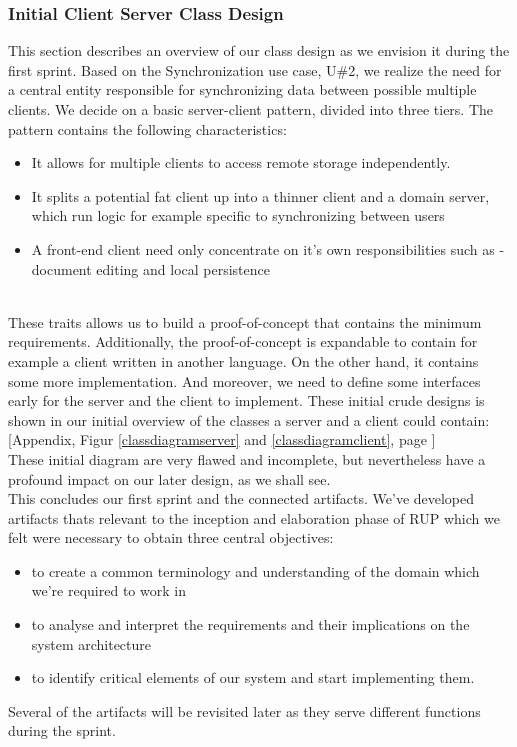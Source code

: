 \subsubsection{Initial Client Server Class Design}
This section describes an overview of our class design as we envision it during the first sprint. Based on the Synchronization use case, U\#2, we realize the need for a central entity responsible for synchronizing data between possible multiple clients. We decide on a basic server-client pattern, divided into three tiers. The pattern contains the following characteristics:\\
\begin{itemize}
\item It allows for multiple clients to access remote storage independently.
\item It splits a potential fat client up into a thinner client and a domain server, which run logic for example specific to synchronizing between users
\item A front-end client need only concentrate on it's own responsibilities such as - document editing and local persistence
\end{itemize}
\cite{ttda}\\
These traits allows us to build a proof-of-concept that contains the minimum requirements. Additionally, the proof-of-concept is expandable to contain for example a client written in another language. On the other hand, it contains some more implementation. And moreover, we need to define some interfaces early for the server and the client to implement. These initial crude designs is shown in our initial overview of the classes a server and a client could contain: [Appendix, Figur \ref{classdiagramserver} and \ref{classdiagramclient}, page \pageref{classdiagramserver}]\\
These initial diagram are very flawed and incomplete, but nevertheless have a profound impact on our later design, as we shall see.\\
\newline
This concludes our first sprint and the connected artifacts. We've developed artifacts thats relevant to the inception and elaboration phase of RUP which we felt were necessary to obtain three central objectives:\\
\begin{itemize}
\item to create a common terminology and understanding of the domain which we're required to work in
\item to analyse and interpret the requirements and their implications on the system architecture
\item to identify critical elements of our system and start implementing them.
\end{itemize}
Several of the artifacts will be revisited later as they serve different functions during the sprint.\\